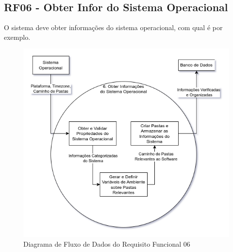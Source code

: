 \documentclass[a4paper,12pt]{article}
\begin{document}
\pagebreak
\subsection{RF06 - Obter Infor do Sistema Operacional}
O sistema deve obter informações do sistema operacional, com qual é por exemplo.
\begin{figure}[H]
	\centering
	\includegraphics[scale=0.45]{DFDs/RF06.drawio.png}
	\caption{Diagrama de Fluxo de Dados do Requisito Funcional 06}
\end{figure}

\pagebreak
\end{document}
